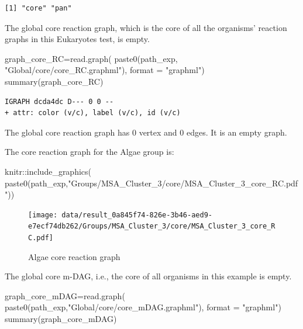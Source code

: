 \documentclass[
  letterpaper,
  DIV=11,
  numbers=noendperiod]{scrreprt}
\newenvironment{Shaded}{}{}
\newcommand{\AttributeTok}[1]{\textcolor[rgb]{0.78,0.47,0.87}{#1}}
\newcommand{\FunctionTok}[1]{\textcolor[rgb]{0.38,0.69,0.94}{#1}}
\newcommand{\NormalTok}[1]{\textcolor[rgb]{0.67,0.70,0.75}{#1}}
\newcommand{\OtherTok}[1]{\textcolor[rgb]{0.15,0.68,0.38}{#1}}
\newcommand{\SpecialCharTok}[1]{\textcolor[rgb]{0.34,0.71,0.76}{#1}}
\newcommand{\StringTok}[1]{\textcolor[rgb]{0.60,0.76,0.47}{#1}}
\begin{document}
\begin{verbatim}
[1] "core" "pan" 
\end{verbatim}

The global core reaction graph, which is the core of all the organisms'
reaction graphs in this Eukaryotes test, is empty.

\begin{Shaded}
\begin{Highlighting}[]
\NormalTok{graph\_core\_RC}\OtherTok{=}\FunctionTok{read.graph}\NormalTok{(}
  \FunctionTok{paste0}\NormalTok{(path\_exp,}
         \StringTok{"Global/core/core\_RC.graphml"}\NormalTok{),}
  \AttributeTok{format =} \StringTok{"graphml"}\NormalTok{)}
\FunctionTok{summary}\NormalTok{(graph\_core\_RC)}
\end{Highlighting}
\end{Shaded}

\begin{verbatim}
IGRAPH dcda4dc D--- 0 0 -- 
+ attr: color (v/c), label (v/c), id (v/c)
\end{verbatim}

The global core reaction graph has 0 vertex and 0 edges. It is an empty
graph.

The core reaction graph for the Algae group is:

\begin{Shaded}
\begin{Highlighting}[]
\NormalTok{knitr}\SpecialCharTok{::}\FunctionTok{include\_graphics}\NormalTok{(}
  \FunctionTok{paste0}\NormalTok{(path\_exp,}\StringTok{"Groups/MSA\_Cluster\_3/core/MSA\_Cluster\_3\_core\_RC.pdf"}\NormalTok{))}
\end{Highlighting}
\end{Shaded}

\begin{figure}[H]

{\centering \texttt{[image: data/result\_0a845f74-826e-3b46-aed9-e7ecf74db262/Groups/MSA\_Cluster\_3/core/MSA\_Cluster\_3\_core\_RC.pdf]}

}

\caption{Algae core reaction graph}

\end{figure}

The global core m-DAG, i.e., the core of all organisms in this example
is empty.

\begin{Shaded}
\begin{Highlighting}[]
\NormalTok{graph\_core\_mDAG}\OtherTok{=}\FunctionTok{read.graph}\NormalTok{(}
  \FunctionTok{paste0}\NormalTok{(path\_exp,}\StringTok{"Global/core/core\_mDAG.graphml"}\NormalTok{),}
  \AttributeTok{format =} \StringTok{"graphml"}\NormalTok{)}
\FunctionTok{summary}\NormalTok{(graph\_core\_mDAG)}
\end{Highlighting}
\end{Shaded}
\end{document}
